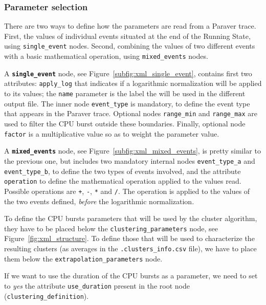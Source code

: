 \documentclass[a4paper, 12pt]{article}
\begin{document}
\subsubsection{Parameter selection}

There are two ways to define how the parameters are read from a Paraver trace.
First, the values of individual events situated at the end of the Running 
State, using \texttt{single\_event} nodes. Second, combining the values of
two different events with a basic mathematical operation, using 
\texttt{mixed\_events} nodes.

A \textbf{\texttt{single\_event}} node, see Figure~\ref{subfig:xml_single_event},
contains first two attributes: \texttt{apply\_log} that indicates if
a logarithmic normalization will be applied to its values; the \texttt{name}
parameter is the label the will be used in the different output file. 
The inner node \texttt{event\_type} is mandatory, to define the event type 
that appears in the Paraver trace. Optional nodes \texttt{range\_min} and 
\texttt{range\_max} are used to filter the CPU burst outside these 
boundaries. Finally, optional node \texttt{factor} is a multiplicative
value so as to weight the parameter value.

A \textbf{\texttt{mixed\_events}} node, see Figure~\ref{subfig:xml_mixed_events},
is pretty similar to the previous one, but includes two mandatory internal
nodes \texttt{event\_type\_a} and \texttt{event\_type\_b}, to define the
two types of events involved, and the attribute \texttt{operation} to define
the mathematical operation applied to the values read. Possible operations
are \texttt{+}, \texttt{-}, \texttt{*} and \texttt{/}. The operation is 
applied to the values of the two events defined, \textit{before} the 
logarithmic normalization.

To define the CPU bursts parameters that will be used by the cluster algorithm,
they have to be placed below the \texttt{clustering\_parameters} node,
see Figure~\ref{fig:xml_structure}. To define those that will be used to
characterize the resulting clusters (as averages in the \texttt{.clusters\_info.csv}
file), we have to place them below the \texttt{extrapolation\_parameters} node.

If we want to use the duration of the CPU bursts as a parameter, we need to 
set to \textit{yes} the attribute \texttt{use\_duration} present in the root
node (\texttt{cluste\-ring\_definition}).

\end{document}
